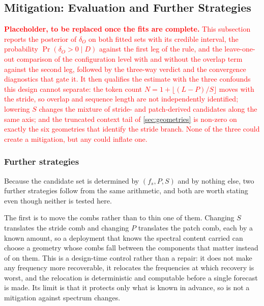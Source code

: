 \subsection{Mitigation: Evaluation and Further Strategies}\label{sec:mitigationDiscussion}
\begingroup
\let\subsection\subsubsection
\textcolor{red}{\textbf{Placeholder, to be replaced once the fits are complete.} This subsection reports the posterior of $\delta_O$ on both fitted sets with its credible interval, the probability $\Pr(\delta_O>0\mid D)$ against the first leg of the rule, and the leave-one-out comparison of the configuration level with and without the overlap term against the second leg, followed by the three-way verdict and the convergence diagnostics that gate it. It then qualifies the estimate with the three confounds this design cannot separate: the token count $N=1+\lfloor(L-P)/S\rfloor$ moves with the stride, so overlap and sequence length are not independently identified; lowering $S$ changes the mixture of stride- and patch-derived candidates along the same axis; and the truncated context tail of \autoref{sec:geometries} is non-zero on exactly the six geometries that identify the stride branch. None of the three could create a mitigation, but any could inflate one.}

\subsection*{Further strategies}

Because the candidate set is determined by $(f_s,P,S)$ and by nothing else, two further strategies follow from the same arithmetic, and both are worth stating even though neither is tested here.

The first is to move the combs rather than to thin one of them. Changing $S$ translates the stride comb and changing $P$ translates the patch comb, each by a known amount, so a deployment that knows the spectral content carried can choose a geometry whose combs fall between the components that matter instead of on them. This is a design-time control rather than a repair: it does not make any frequency more recoverable, it relocates the frequencies at which recovery is worst, and the relocation is deterministic and computable before a single forecast is made. Its limit is that it protects only what is known in advance, so is not a mitigation against spectrum changes.

